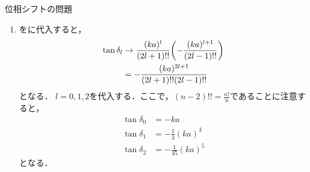 \documentclass{report}
\begin{document}
\begin{myex}{位相シフトの問題}{}
\begin{enumerate}
\begin{align}
          \e^{2\i \delta_l} h_l^{(1)} (ka) + h_l^{(2)}(ka) = 0 \\
          \e^{2\i \delta_l}\qty(j_l(ka) + \i y_l(ka)) + \qty(j_l(ka) - \i y_l(ka)) = 0 \\
          \qty(\e^{2\i \delta_l} + 1)j_l(ka) + \i\qty(\e^{2\i \delta_l} - 1)y_l(ka) = 0 \\
          2\cos\delta_l j_l(ka) -2 \sin\delta_l y_l(ka) = 0
        \end{align}
        となり，位相シフトとして，
        \begin{align}
          \tan\delta_l = \frac{j_l(ka)}{y_l(ka)}\label{phaseshift}
        \end{align}
        が得られる．
      \item {}をに代入すると，
        \begin{align}
          \tan\delta_l &\to \frac{(ka)^l}{(2l+1)!!} \qty(- \frac{(ka)^{l + 1}}{(2l -1)!!}) \\
          &= -\frac{(ka)^{2l + 1}}{(2l + 1)!!(2l - 1)!!} \\
        \end{align}
        となる．
        $l = 0, 1, 2$を代入する．ここで，$(n - 2)!! = \frac{n!}{n}$であることに注意すると，
        \begin{align}
          \tan\delta_0 &= -ka \\
          \tan\delta_1 &= -\frac{1}{3}(ka)^3 \\
          \tan\delta_2 &= -\frac{1}{45}(ka)^5
        \end{align}
        となる．
    \end{enumerate}
  \end{myex}
\end{document}
